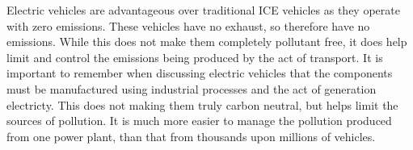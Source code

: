Electric vehicles are advantageous over traditional ICE vehicles as they operate with zero emissions. These vehicles have no exhaust, so therefore have no emissions. While this does not make them completely pollutant free, it does help limit and control the emissions being produced by the act of transport. It is important to remember when discussing electric vehicles that the components must be manufactured using industrial processes and the act of generation electricty. This does not making them truly carbon neutral, but helps limit the sources of pollution. It is much more easier to manage the pollution produced from one power plant, than that from thousands upon millions of vehicles.
\cite{citeulike:9725737}










%






